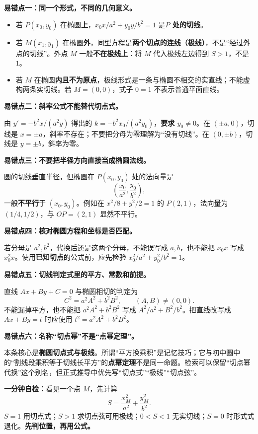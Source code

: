 \begin{trapbox}
\textbf{易错点一：同一个形式，不同的几何意义。}
\begin{itemize}
    \item 若 $P(x_0,y_0)$ 在椭圆\textbf{上}，$x_0x/a^2+y_0y/b^2=1$ 是\textbf{$P$ 处的切线}。
    \item 若 $M(x_1,y_1)$ 在椭圆\textbf{外}，同型方程是\textbf{两个切点的连线（极线）}，不是“经过外点的切线”。外点 $M$ 一般\textbf{不在极线上}：将 $M$ 代入极线左边得到 $S>1$，不是 $1$。
    \item 若 $M$ 在椭圆\textbf{内且不为原点}，极线形式是一条与椭圆不相交的实直线；不能虚构两条实切线。若 $M=(0,0)$，式子 $0=1$ 不表示普通平面直线。
\end{itemize}

\medskip
\textbf{易错点二：斜率公式不能替代切点式。}

由 $y'= -b^2x/(a^2y)$ 得出的 $k=-b^2x_0/(a^2y_0)$，\textbf{要求 $y_0\ne0$}。在 $(\pm a,0)$，切线是 $x=\pm a$，斜率不存在；不要把分母为零理解为“没有切线”。在 $(0,\pm b)$，切线是 $y=\pm b$，斜率为零。

\medskip
\textbf{易错点三：不要把半径方向直接当成椭圆法线。}

圆的切线垂直半径，但椭圆在 $P(x_0,y_0)$ 处的法向量是
\[
 \left(\frac{x_0}{a^2},\frac{y_0}{b^2}\right),
\]
一般\textbf{不平行}于 $(x_0,y_0)$。例如在 $x^2/8+y^2/2=1$ 的 $P(2,1)$，法向量为 $(1/4,1/2)$，与 $OP=(2,1)$ 显然不平行。

\medskip
\textbf{易错点四：核对椭圆方程和坐标是否匹配。}

若分母是 $a^2,b^2$，代换后还是这两个分母，不能误写成 $a,b$，也不能把 $x_0x$ 写成 $x_0^2x$。使用\textbf{已知切点}的公式前，应先检验 $x_0^2/a^2+y_0^2/b^2=1$。

\medskip
\textbf{易错点五：切线判定式里的平方、常数和前提。}

直线 $Ax+By+C=0$ 与椭圆相切的判定为
\[
 C^2=a^2A^2+b^2B^2,\qquad(A,B)\ne(0,0).
\]
不能漏掉平方，也不能把 $a^2A^2+b^2B^2$ 写成 $A^2/a^2+B^2/b^2$。把直线改写成 $Ax+By=t$ 时应使用 $t^2=a^2A^2+b^2B^2$。

\medskip
\textbf{易错点六：名称“切点幂”不是“点幂定理”。}

本条核心是\textbf{椭圆切点式与极线}。所谓“平方换乘积”是记忆技巧；它与初中圆中的“割线段乘积等于切线长平方”的\textbf{点幂定理}不是同一命题。检索可以保留“切点幂代换”这个别名，但正式推导中优先写“切点式”“极线”“切点弦”。

\medskip
\textbf{一分钟自检：}看见一个点 $M$，先计算
\[
 S=\frac{x_M^2}{a^2}+\frac{y_M^2}{b^2}.
\]
$S=1$ 用切点式；$S>1$ 求切点弦可用极线；$0<S<1$ 无实切线；$S=0$ 时形式式退化。\textbf{先判位置，再用公式。}
\end{trapbox}
